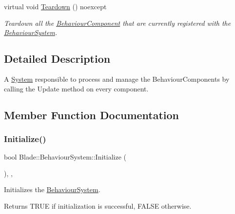 \begin{DoxyCompactItemize}
\mbox{\label{class_blade_1_1_behaviour_system_a0082ff7fcadd9224983589b66b027225}} 
virtual void \hyperlink{class_blade_1_1_behaviour_system_a0082ff7fcadd9224983589b66b027225}{Teardown} () noexcept
\begin{DoxyCompactList}\small\item\em Teardown all the \hyperlink{class_blade_1_1_behaviour_component}{Behaviour\+Component} that are currently registered with the \hyperlink{class_blade_1_1_behaviour_system}{Behaviour\+System}. \end{DoxyCompactList}\end{DoxyCompactItemize}


\subsection{Detailed Description}
A \hyperlink{class_blade_1_1_system}{System} responsible to process and manage the Behaviour\+Components by calling the Update method on every component. 

\subsection{Member Function Documentation}
\mbox{\label{class_blade_1_1_behaviour_system_ac4d601f2f88faf7deceb78e01ca8d6be}} 
\subsubsection{\texorpdfstring{Initialize()}{Initialize()}}
{\footnotesize\ttfamily bool Blade\+::\+Behaviour\+System\+::\+Initialize (\begin{DoxyParamCaption}{ }\end{DoxyParamCaption})\hspace{0.3cm}{\ttfamily [override]}, {\ttfamily [virtual]}, {\ttfamily [noexcept]}}



Initializes the \hyperlink{class_blade_1_1_behaviour_system}{Behaviour\+System}. 

\begin{DoxyReturn}{Returns}
T\+R\+UE if initialization is successful, F\+A\+L\+SE otherwise. 
\end{DoxyReturn}


